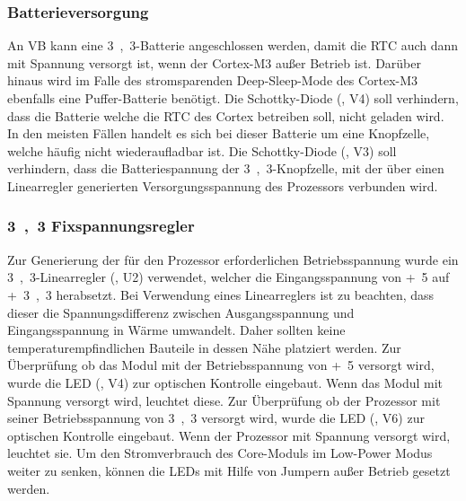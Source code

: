 \subsubsection{Batterieversorgung}
An VB kann eine \unit{3,3}{\volt}-Batterie angeschlossen werden, damit die \gls{RTC} auch dann mit Spannung versorgt ist, wenn der Cortex-M3 außer Betrieb ist. Darüber hinaus wird im Falle des stromsparenden Deep-Sleep-Mode des Cortex-M3 ebenfalls eine Puffer-Batterie benötigt. Die Schottky-Diode (, V4) soll verhindern, dass die Batterie welche die \gls{RTC} des Cortex betreiben soll, nicht geladen wird. In den meisten Fällen handelt es sich bei dieser Batterie um eine Knopfzelle, welche häufig nicht wiederaufladbar ist. Die Schottky-Diode (, V3) soll verhindern, dass die Batteriespannung der \unit{3,3}{\volt}-Knopfzelle, mit der über einen Linearregler generierten Versorgungsspannung des Prozessors verbunden wird.


\subsubsection{\unit{3,3}{\volt} Fixspannungsregler}
Zur Generierung der für den Prozessor erforderlichen Betriebsspannung wurde ein \unit{3,3}{\volt}-Linearregler (, U2) verwendet, welcher die Eingangsspannung von \unit{+5}{\volt} auf \unit{+3,3}{\volt} herabsetzt. Bei Verwendung eines Linearreglers ist zu beachten, dass dieser die Spannungsdifferenz zwischen Ausgangsspannung und Eingangsspannung in Wärme umwandelt. Daher sollten keine temperaturempfindlichen Bauteile in dessen Nähe platziert werden. Zur Überprüfung ob das Modul mit der Betriebsspannung von \unit{+5}{\volt} versorgt wird, wurde die LED (, V4) zur optischen Kontrolle eingebaut. Wenn das Modul mit Spannung versorgt wird, leuchtet diese. Zur Überprüfung ob der Prozessor mit seiner Betriebsspannung von \unit{3,3}{\volt} versorgt wird, wurde die LED (, V6) zur optischen Kontrolle eingebaut. Wenn der Prozessor mit Spannung versorgt wird, leuchtet sie. Um den Stromverbrauch des \gls{Core-Modul}s im Low-Power Modus weiter zu senken, können die LEDs mit Hilfe von Jumpern außer Betrieb gesetzt werden.


